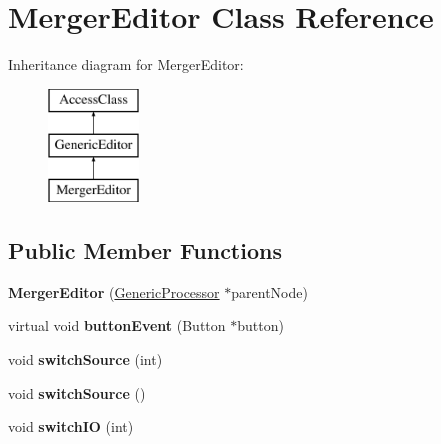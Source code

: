 \hypertarget{classMergerEditor}{\section{Merger\-Editor Class Reference}
\label{classMergerEditor}
}
Inheritance diagram for Merger\-Editor\-:\begin{figure}[H]
\begin{center}
\leavevmode
\includegraphics[height=3.000000cm]{classMergerEditor}
\end{center}
\end{figure}
\subsection*{Public Member Functions}
\begin{DoxyCompactItemize}
\item 
\hypertarget{classMergerEditor_a06207ecf36305b3cc68802e7c64aa6b0}{{\bfseries Merger\-Editor} (\hyperlink{classGenericProcessor}{Generic\-Processor} $\ast$parent\-Node)}\label{classMergerEditor_a06207ecf36305b3cc68802e7c64aa6b0}

\item 
\hypertarget{classMergerEditor_a14a01ae643f38d2e677d8fcc72f33d9c}{virtual void {\bfseries button\-Event} (Button $\ast$button)}\label{classMergerEditor_a14a01ae643f38d2e677d8fcc72f33d9c}

\item 
\hypertarget{classMergerEditor_ae31d2de72e81f4cacdc73ebd82d97752}{void {\bfseries switch\-Source} (int)}\label{classMergerEditor_ae31d2de72e81f4cacdc73ebd82d97752}

\item 
\hypertarget{classMergerEditor_af14e4889f12827d50ad517b6cc6d8068}{void {\bfseries switch\-Source} ()}\label{classMergerEditor_af14e4889f12827d50ad517b6cc6d8068}

\item 
\hypertarget{classMergerEditor_a063dd5e128be8ac8e55241966f88c807}{void {\bfseries switch\-I\-O} (int)}\label{classMergerEditor_a063dd5e128be8ac8e55241966f88c807}

\end{DoxyCompactItemize}
